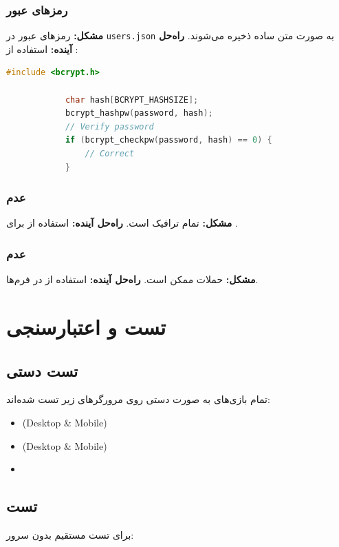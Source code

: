 \documentclass[12pt,a4paper]{article}
\begin{document}
	\subsubsection{رمزهای عبور }
	\textbf{مشکل:} رمزهای عبور در \texttt{users.json} به صورت متن ساده ذخیره می‌شوند.
	\textbf{راه‌حل آینده:} استفاده از :
	
	\begin{latin}
		\begin{lstlisting}[language=C, caption=استفاده از bcrypt]
			#include <bcrypt.h>
			
			char hash[BCRYPT_HASHSIZE];
			bcrypt_hashpw(password, hash);
			// Verify password
			if (bcrypt_checkpw(password, hash) == 0) {
				// Correct
			}
		\end{lstlisting}
	\end{latin}
	
	\subsubsection{عدم }
	\textbf{مشکل:} تمام ترافیک  است.
	\textbf{راه‌حل آینده:} استفاده از  برای .
	
	\subsubsection{عدم }
	\textbf{مشکل:} حملات  ممکن است.
	\textbf{راه‌حل آینده:} استفاده از  در فرم‌ها.
	
	
	\newpage
	\section{تست و اعتبارسنجی}
	
	\subsection{تست دستی}
	تمام بازی‌های به صورت دستی روی مرورگرهای زیر تست شده‌اند:
	
	\begin{itemize}
		\item {} (Desktop \& Mobile)
		\item {} (Desktop \& Mobile)
		\item {}
	\end{itemize}
	
	\subsection{تست }
	برای تست مستقیم  بدون سرور:
	
\end{document}
